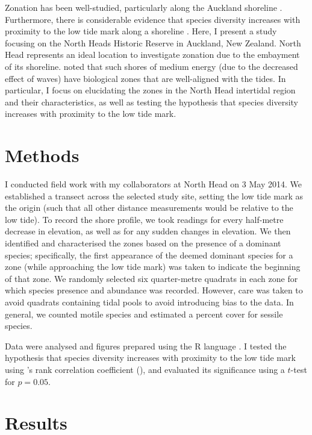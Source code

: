 \documentclass[11pt]{article}
\newcommand{\aposcite}[2]{\citeauthor{#1}'s #2 (\citeyear{#1})}
\begin{document}
	Zonation has been well-studied, particularly along the Auckland shoreline \parencite{Dellow:1950,Creese:1988,Morton:2004}. Furthermore, there is considerable evidence that species diversity increases with proximity to the low tide mark along a shoreline \parencite{Armonies:2000,McLachlan:2006}. Here, I present a study focusing on the North Heads Historic Reserve in Auckland, New Zealand. North Head represents an ideal location to investigate zonation due to the embayment of its shoreline. \textcite{Morton:2004} noted that such shores of medium energy (due to the decreased effect of waves) have biological zones that are well-aligned with the tides. In particular, I focus on elucidating the zones in the North Head intertidal region and their characteristics, as well as testing the hypothesis that species diversity increases with proximity to the low tide mark.
	
	\section*{Methods}
	
	I conducted field work with my collaborators at North Head on 3 May 2014. We established a transect across the selected study site, setting the low tide mark as the origin (such that all other distance measurements would be relative to the low tide). To record the shore profile, we took readings for every half-metre decrease in elevation, as well as for any sudden changes in elevation. We then identified and characterised the zones based on the presence of a dominant species; specifically, the first appearance of the deemed dominant species for a zone (while approaching the low tide mark) was taken to indicate the beginning of that zone. We randomly selected six quarter-metre quadrats in each zone for which species presence and abundance was recorded. However, care was taken to avoid quadrats containing tidal pools to avoid introducing bias to the data. In general, we counted motile species and estimated a percent cover for sessile species.
	
	Data were analysed and figures prepared using the R language \parencite{R}. I tested the hypothesis that species diversity increases with proximity to the low tide mark using \aposcite{Spearman:1904}{rank correlation coefficient}, and evaluated its significance using a $t$-test \parencite{Kendall:1973} for $p = 0.05$.
	
	\section*{Results}
		
\end{document}
